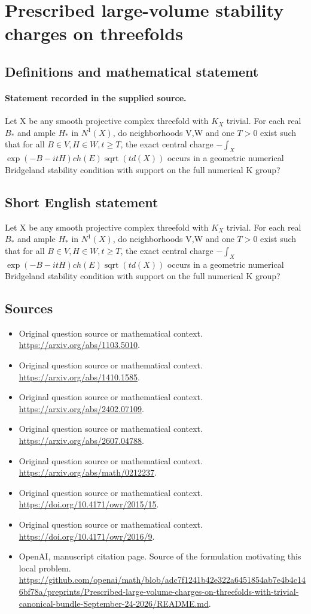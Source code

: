 \documentclass[11pt]{article}
\begin{document}
\section*{Prescribed large-volume stability charges on threefolds}\label{30007055}
\subsection{Definitions and mathematical statement}
\paragraph{Statement recorded in the supplied source.}
Let X be any smooth projective complex threefold with $K_X$ trivial. For each real $B_*$ and ample $H_*$ in $N^{1}(X)$, do neighborhoods V,W and one $T>0$ exist such that for all $B\in V,H\in W,t\geq T$, the exact central charge $-\int _X$ $\exp (-B-itH)ch(E)\operatorname{sqrt}(td(X))$ occurs in a geometric numerical Bridgeland stability condition with support on the full numerical K group?
\subsection{Short English statement}
Let X be any smooth projective complex threefold with $K_X$ trivial. For each real $B_*$ and ample $H_*$ in $N^{1}(X)$, do neighborhoods V,W and one $T>0$ exist such that for all $B\in V,H\in W,t\geq T$, the exact central charge $-\int _X$ $\exp (-B-itH)ch(E)\operatorname{sqrt}(td(X))$ occurs in a geometric numerical Bridgeland stability condition with support on the full numerical K group?
\subsection{Sources}
\begin{itemize}
\item[S1] Original question source or mathematical context.
\url{https://arxiv.org/abs/1103.5010}.
\item[S2] Original question source or mathematical context.
\url{https://arxiv.org/abs/1410.1585}.
\item[S3] Original question source or mathematical context.
\url{https://arxiv.org/abs/2402.07109}.
\item[S4] Original question source or mathematical context.
\url{https://arxiv.org/abs/2607.04788}.
\item[S5] Original question source or mathematical context.
\url{https://arxiv.org/abs/math/0212237}.
\item[S6] Original question source or mathematical context.
\url{https://doi.org/10.4171/owr/2015/15}.
\item[S7] Original question source or mathematical context.
\url{https://doi.org/10.4171/owr/2016/9}.
\item[S8] OpenAI, manuscript citation page. Source of the formulation motivating this local problem.
\url{https://github.com/openai/math/blob/adc7f1241b42e322a6451854ab7e4b4c146bf78a/preprints/Prescribed-large-volume-charges-on-threefolds-with-trivial-canonical-bundle-September-24-2026/README.md}.
\end{itemize}
\end{document}
